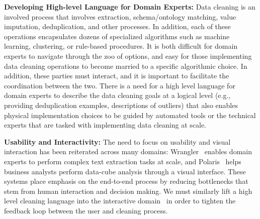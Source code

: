 
\vspace{0.5em}
\noindent\textbf{Developing High-level Language for Domain Experts:} Data cleaning is an involved process that involves extraction, schema/ontology matching, value imputation, deduplication, and other processes.
In addition, each of these operations encapsulates dozens of specialized algorithms such as machine learning, clustering, or rule-based procedures.
It is both difficult for domain experts to navigate through the zoo of options, and easy for those implementing data cleaning operations to become married to a specific algorithmic choice.
In addition, these parties must interact, and it is important to facilitate the coordination between the two.
There is a need for a high level language for domain experts to describe the data cleaning goals at a logical level (e.g., providing deduplication examples, descriptions of outliers) that also enables physical implementation choices to be guided by automated tools or the technical experts that are tasked with implementing data cleaning at scale. {\color{red}{more details?}} 

\vspace{0.5em}
\noindent\textbf{Usability and Interactivity:} The need to focus on usability and visual interaction has been reiterated across many domains:  Wrangler~\cite{kandel2011wrangler} enables domain experts to perform complex text extraction tasks at scale, and  Polaris~\cite{stolte2002polaris} helps business analysts perform data-cube analysis through a visual interface. These systems place emphasis on the end-to-end process by reducing bottlenecks that stem from human interaction and decision making.    We must similarly lift a high level cleaning language into the interactive domain~\cite{heer2015predictive} in order to tighten the feedback loop between the user and cleaning process.

